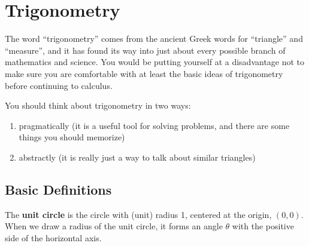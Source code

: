 \section{Trigonometry}
\label{sec:trigonometry}

The word ``trigonometry'' comes from the ancient Greek words for ``triangle'' and ``measure'', and it has found its way into just about every possible branch of mathematics and science. You would be putting yourself at a disadvantage not to make sure you are comfortable with at least the basic ideas of trigonometry before continuing to calculus.

You should think about trigonometry in two ways:
\begin{enumerate}
\item pragmatically (it is a useful tool for solving problems, and there are some things you should memorize)
\item abstractly (it is really just a way to talk about similar triangles)
\end{enumerate}

\subsection{Basic Definitions}
The \textbf{unit circle} is the circle with (unit) radius 1, centered at the origin, $(0,0)$. When we draw a radius of the unit circle, it forms an angle $\theta$ with the positive side of the horizontal axis.

